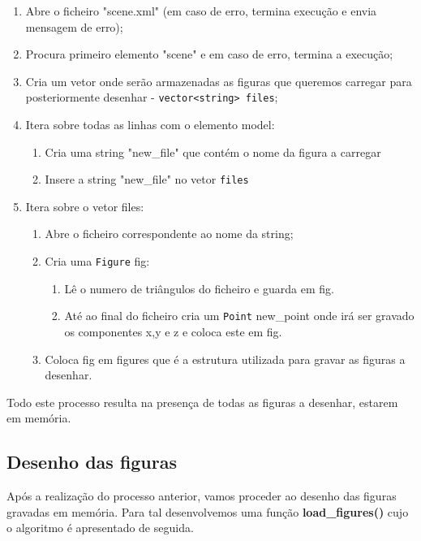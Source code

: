 \documentclass[a4paper]{article}
\begin{document}
\begin{enumerate}
	\item Abre o ficheiro "scene.xml" (em caso de erro, termina execução e envia mensagem de erro);
	\item Procura primeiro elemento "scene" e em caso de erro, termina a execução;
	\item Cria um vetor onde serão armazenadas as figuras que queremos carregar para posteriormente desenhar - \texttt{vector<string> files};
	\item Itera sobre todas as linhas com o elemento model:

	\begin{enumerate}
		\item Cria uma string "new\_file" que contém o nome da figura a carregar
		\item Insere a string "new\_file" no vetor \texttt{files}
	\end{enumerate}

	\item Itera sobre o vetor files:

	\begin{enumerate}
		\item Abre o ficheiro correspondente ao nome da string;
		\item Cria uma \texttt{Figure} fig:

		\begin{enumerate}
			\item Lê o numero de triângulos do ficheiro e guarda em fig.
			\item Até ao final do ficheiro cria um \texttt{Point} new\_point onde irá ser gravado os componentes x,y e z e coloca este em fig.
		\end{enumerate}
		\item Coloca fig em figures que é a estrutura utilizada para gravar as figuras a desenhar.
	\end{enumerate}
\end{enumerate}

Todo este processo resulta na presença de todas as figuras a desenhar, estarem em memória.

\subsection{Desenho das figuras}

Após a realização do processo anterior, vamos proceder ao desenho das figuras gravadas em memória. Para tal desenvolvemos uma função \textbf{load\_figures()} cujo o algoritmo é apresentado de seguida.
\end{document}
